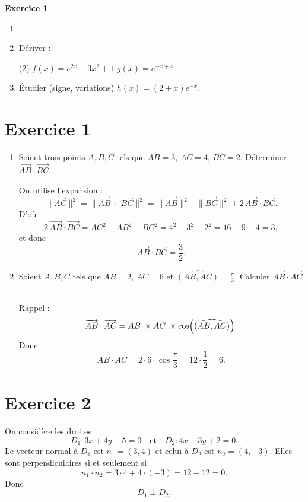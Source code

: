 \documentclass{article}
\theoremstyle{definition}
\newtheorem{exercice}{Exercice}
\begin{document}
\vfill

\begin{exercice}
  \begin{enumerate}
    \item[]
    \item Dériver :
    \begin{tasks}(2)
      \task $f(x)=e^{2x}-3x^2+1$
      \task $g(x)=e^{-x+4}$
    \end{tasks}
    \item Étudier (signe, variations) $h(x)=(2+x)e^{-x}$.
  \end{enumerate}
\end{exercice}

\newpage 
\section*{Exercice 1}
\begin{enumerate}
  \item Soient trois points $A,B,C$ tels que $AB=3$, $AC=4$, $BC=2$. Déterminer $\overrightarrow{AB}\cdot\overrightarrow{BC}$.

    On utilise l'expansion :
  \[
  \|\overrightarrow{AC}\|^2
  = \|\overrightarrow{AB} + \overrightarrow{BC}\|^2
  = \|\overrightarrow{AB}\|^2 + \|\overrightarrow{BC}\|^2 + 2\,\overrightarrow{AB}\cdot\overrightarrow{BC}.
  \]
  D'où
  \[
  2\,\overrightarrow{AB}\cdot\overrightarrow{BC}
  = AC^2 - AB^2 - BC^2
  = 4^2 - 3^2 - 2^2
  = 16 - 9 - 4
  = 3,
  \]
  et donc
  \[
  \boxed{\overrightarrow{AB}\cdot\overrightarrow{BC} = \frac{3}{2}.}
\]


  \item Soient $A,B,C$ tels que $AB=2$, $AC=6$ et $\widehat{(AB,AC)}=\frac\pi3$. Calculer $\overrightarrow{AB}\cdot\overrightarrow{AC}$.

    Rappel :
    \[
      \overrightarrow{AB}\cdot\overrightarrow{AC}
      = AB\;\times AC\;\times\cos\Bigl(\widehat{(AB,AC)}\Bigr).
    \]
    Donc
    \[
      \overrightarrow{AB}\cdot\overrightarrow{AC}
      = 2\cdot6\cdot\cos\frac\pi3
      = 12\cdot\frac12
      = \boxed{6.}
    \]
\end{enumerate}

\section*{Exercice 2}
On considère les droites
\[
  D_1 : 3x + 4y - 5 = 0
  \quad\text{et}\quad
  D_2 : 4x - 3y + 2 = 0.
\]
Le vecteur normal à $D_1$ est $n_1=(3,4)$ et celui à $D_2$ est $n_2=(4,-3)$. Elles sont perpendiculaires si et seulement si
\[
  n_1\cdot n_2 = 3\cdot4 + 4\cdot(-3) = 12 -12 = 0.
\]
Donc
\[
  \boxed{D_1 \perp D_2.}
\]
\end{document}
